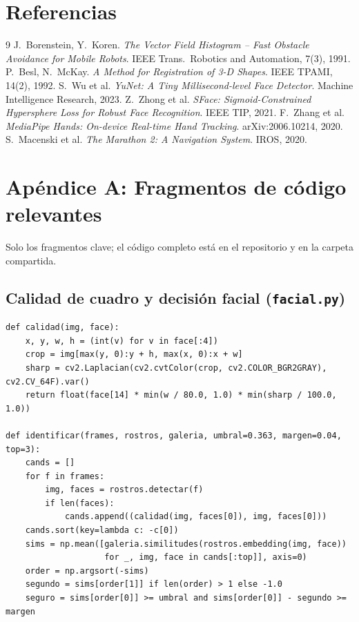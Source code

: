 \documentclass[11pt,a4paper]{article}
\begin{document}
\section*{Referencias}
\begin{thebibliography}{9}
 J.~Borenstein, Y.~Koren. \emph{The Vector Field Histogram -- Fast Obstacle Avoidance for Mobile Robots}. IEEE Trans.\ Robotics and Automation, 7(3), 1991.
 P.~Besl, N.~McKay. \emph{A Method for Registration of 3-D Shapes}. IEEE TPAMI, 14(2), 1992.
 S.~Wu et al. \emph{YuNet: A Tiny Millisecond-level Face Detector}. Machine Intelligence Research, 2023.
 Z.~Zhong et al. \emph{SFace: Sigmoid-Constrained Hypersphere Loss for Robust Face Recognition}. IEEE TIP, 2021.
 F.~Zhang et al. \emph{MediaPipe Hands: On-device Real-time Hand Tracking}. arXiv:2006.10214, 2020.
 S.~Macenski et al. \emph{The Marathon 2: A Navigation System}. IROS, 2020.
\end{thebibliography}

\appendix
\section{Ap\'endice A: Fragmentos de c\'odigo relevantes}
Solo los fragmentos clave; el c\'odigo completo est\'a en el repositorio y en la carpeta compartida.

\subsection{Calidad de cuadro y decisi\'on facial (\texttt{facial.py})}
\begin{lstlisting}
def calidad(img, face):
    x, y, w, h = (int(v) for v in face[:4])
    crop = img[max(y, 0):y + h, max(x, 0):x + w]
    sharp = cv2.Laplacian(cv2.cvtColor(crop, cv2.COLOR_BGR2GRAY), cv2.CV_64F).var()
    return float(face[14] * min(w / 80.0, 1.0) * min(sharp / 100.0, 1.0))

def identificar(frames, rostros, galeria, umbral=0.363, margen=0.04, top=3):
    cands = []
    for f in frames:
        img, faces = rostros.detectar(f)
        if len(faces):
            cands.append((calidad(img, faces[0]), img, faces[0]))
    cands.sort(key=lambda c: -c[0])
    sims = np.mean([galeria.similitudes(rostros.embedding(img, face))
                    for _, img, face in cands[:top]], axis=0)
    order = np.argsort(-sims)
    segundo = sims[order[1]] if len(order) > 1 else -1.0
    seguro = sims[order[0]] >= umbral and sims[order[0]] - segundo >= margen
\end{lstlisting}
\end{document}
